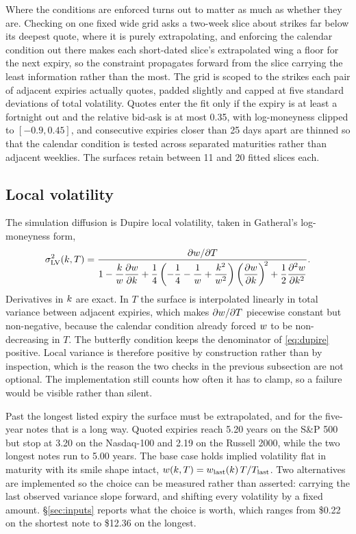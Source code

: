 Where the conditions are enforced turns out to matter as much as whether they
are. Checking on one fixed wide grid asks a two-week slice about strikes far
below its deepest quote, where it is purely extrapolating, and enforcing the
calendar condition out there makes each short-dated slice's extrapolated
wing a floor for the next expiry, so the constraint propagates forward from the
slice carrying the least information rather than the most. The grid is scoped
to the strikes each pair of adjacent expiries actually quotes, padded slightly
and capped at five standard deviations of total volatility. Quotes enter the fit
only if the expiry is at least a fortnight out and the relative bid-ask is at
most 0.35, with log-moneyness clipped to $[-0.9, 0.45]$, and consecutive
expiries closer than 25 days apart are thinned so that the calendar condition
is tested across separated maturities rather than adjacent weeklies. The
surfaces retain between 11 and 20 fitted slices each.

\subsection{Local volatility}

The simulation diffusion is Dupire local volatility, taken in Gatheral's
log-moneyness form,
%
\begin{equation}
  \sigma_{\mathrm{LV}}^2(k, T) = \frac{\partial w/\partial T}
    {1 - \dfrac{k}{w}\dfrac{\partial w}{\partial k}
      + \dfrac14\left(-\dfrac14 - \dfrac{1}{w}
        + \dfrac{k^2}{w^2}\right)
        \left(\dfrac{\partial w}{\partial k}\right)^{\!2}
      + \dfrac12\dfrac{\partial^2w}{\partial k^2}}.
  \label{eq:dupire}
\end{equation}
%
Derivatives in $k$ are exact. In $T$ the surface is interpolated linearly
in total variance between adjacent expiries, which makes
$\partial w/\partial T$ piecewise constant but non-negative, because the
calendar condition already forced $w$ to be non-decreasing in $T$. The
butterfly condition keeps the denominator of \eqref{eq:dupire} positive. Local
variance is therefore positive by construction rather than by inspection, which
is the reason the two checks in the previous subsection are not optional. The
implementation still counts how often it has to clamp, so a failure would be
visible rather than silent.

Past the longest listed expiry the surface must be extrapolated, and for the
five-year notes that is a long way. Quoted expiries reach 5.20 years on the
S\&P 500 but stop at 3.20 on the Nasdaq-100 and 2.19 on the Russell 2000, while
the two longest notes run to 5.00 years. The base case holds implied volatility
flat in maturity with its smile shape intact,
$w(k,T) = w_{\mathrm{last}}(k)\,T/T_{\mathrm{last}}$. Two
alternatives are implemented so the choice can be measured rather than
asserted: carrying the last observed variance slope forward, and shifting every
volatility by a fixed amount. \S\ref{sec:inputs} reports what the choice is
worth, which ranges from \$0.22 on the shortest note to \$12.36 on the longest.

